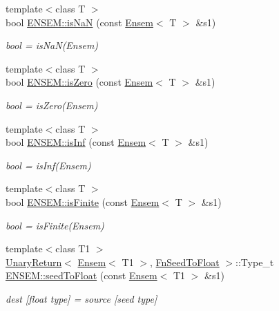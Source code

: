 \begin{DoxyCompactItemize}
{\footnotesize template$<$class T $>$ }\\bool \mbox{\hyperlink{group__eensem_ga2567a8b58f681cf59bfe43ccf72d2d54}{E\+N\+S\+E\+M\+::is\+NaN}} (const \mbox{\hyperlink{classENSEM_1_1Ensem}{Ensem}}$<$ T $>$ \&s1)
\begin{DoxyCompactList}\small\item\em bool = is\+Na\+N(\+Ensem) \end{DoxyCompactList}\item 
{\footnotesize template$<$class T $>$ }\\bool \mbox{\hyperlink{group__eensem_gaa66b7f8af2e0f2f38b3a8387b5848c5b}{E\+N\+S\+E\+M\+::is\+Zero}} (const \mbox{\hyperlink{classENSEM_1_1Ensem}{Ensem}}$<$ T $>$ \&s1)
\begin{DoxyCompactList}\small\item\em bool = is\+Zero(\+Ensem) \end{DoxyCompactList}\item 
{\footnotesize template$<$class T $>$ }\\bool \mbox{\hyperlink{group__eensem_gadb04ba05461a486afdf403c61b5bff34}{E\+N\+S\+E\+M\+::is\+Inf}} (const \mbox{\hyperlink{classENSEM_1_1Ensem}{Ensem}}$<$ T $>$ \&s1)
\begin{DoxyCompactList}\small\item\em bool = is\+Inf(\+Ensem) \end{DoxyCompactList}\item 
{\footnotesize template$<$class T $>$ }\\bool \mbox{\hyperlink{group__eensem_ga13016a14218fbe75f26f9acd37e1efe5}{E\+N\+S\+E\+M\+::is\+Finite}} (const \mbox{\hyperlink{classENSEM_1_1Ensem}{Ensem}}$<$ T $>$ \&s1)
\begin{DoxyCompactList}\small\item\em bool = is\+Finite(\+Ensem) \end{DoxyCompactList}\item 
{\footnotesize template$<$class T1 $>$ }\\\mbox{\hyperlink{structENSEM_1_1UnaryReturn}{Unary\+Return}}$<$ \mbox{\hyperlink{classENSEM_1_1Ensem}{Ensem}}$<$ T1 $>$, \mbox{\hyperlink{structENSEM_1_1FnSeedToFloat}{Fn\+Seed\+To\+Float}} $>$\+::Type\+\_\+t \mbox{\hyperlink{group__eensem_ga92fac3bc9ad6164daf90b83052f0d48e}{E\+N\+S\+E\+M\+::seed\+To\+Float}} (const \mbox{\hyperlink{classENSEM_1_1Ensem}{Ensem}}$<$ T1 $>$ \&s1)
\begin{DoxyCompactList}\small\item\em dest \mbox{[}float type\mbox{]} = source \mbox{[}seed type\mbox{]} \end{DoxyCompactList}\item 

\end{DoxyCompactItemize}
